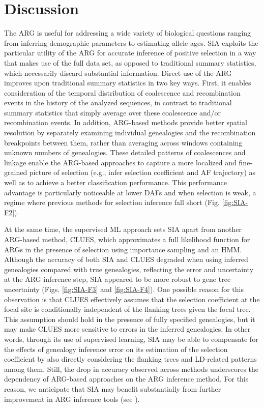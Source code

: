 \section{Discussion} \label{discussion}
The \ac{ARG} is useful for addressing a wide variety of biological questions ranging from inferring demographic parameters to estimating allele ages. \ac{SIA} exploits the particular utility of the \ac{ARG} for accurate inference of positive selection in a way that makes use of the full data set, as opposed to traditional summary statistics, which necessarily discard substantial information. Direct use of the \ac{ARG} improves upon traditional summary statistics in two key ways. First, it enables consideration of the temporal distribution of coalescence and recombination events in the history of the analyzed sequences, in contrast to traditional summary statistics that simply average over these coalescence and/or recombination events. In addition, \ac{ARG}-based methods provide better spatial resolution by separately examining individual genealogies and the recombination breakpoints between them, rather than averaging across windows containing unknown numbers of genealogies. These detailed patterns of coalescences and linkage enable the \ac{ARG}-based approaches to capture a more localized and fine-grained picture of selection (e.g., infer selection coefficient and \ac{AF} trajectory) as well as to achieve a better classification performance. This performance advantage is particularly noticeable at lower \acp{DAF} and when selection is weak, a regime where previous methods for selection inference fall short (Fig. \ref{fig:SIA-F2}).

At the same time, the supervised \ac{ML} approach sets \ac{SIA} apart from another \ac{ARG}-based method, CLUES, which approximates a full likelihood function for \acp{ARG} in the presence of selection using importance sampling and an \ac{HMM}. Although the accuracy of both \ac{SIA} and CLUES degraded when using inferred genealogies compared with true genealogies, reflecting the error and uncertainty at the \ac{ARG} inference step, \ac{SIA} appeared to be more robust to gene tree uncertainty (Figs. \ref{fig:SIA-F3} and \ref{fig:SIA-F4}). One possible reason for this observation is that CLUES effectively assumes that the selection coefficient at the focal site is conditionally independent of the flanking trees given the focal tree. This assumption should hold in the presence of fully specified genealogies, but it may make CLUES more sensitive to errors in the inferred genealogies. In other words, through its use of supervised learning, \ac{SIA} may be able to compensate for the effects of genealogy inference error on its estimation of the selection coefficient by also directly considering the flanking trees and \acs{LD}-related patterns among them. Still, the drop in accuracy observed across methods underscores the dependency of \ac{ARG}-based approaches on the \ac{ARG} inference method. For this reason, we anticipate that \ac{SIA} may benefit substantially from further improvement in \ac{ARG} inference tools (see \cite{hejase_summary_2020}).

